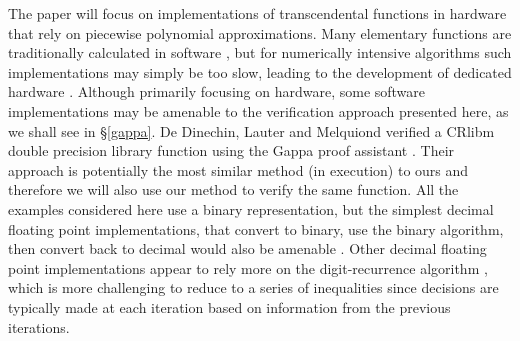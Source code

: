 \documentclass{fac}
\begin{document}
The paper will focus on implementations of transcendental functions in hardware that rely on piecewise polynomial approximations. Many elementary functions are traditionally calculated in software \cite{10.5555/1096483,gal1991accurate}, but for numerically intensive algorithms such implementations may simply be too slow, leading to the development of dedicated hardware \cite{tang1991table,strollo2011elementary,pineiro2004algorithm}. Although primarily focusing on hardware, some software implementations may be amenable to the verification approach presented here, as we shall see in \S\ref{gappa}. De Dinechin, Lauter and Melquiond verified a CRlibm double precision library function using the Gappa proof assistant \cite{daramy2009cr,5483294}. Their approach is potentially the most similar method (in execution) to ours and therefore we will also use our method to verify the same function. All the examples considered here use a binary representation, but the simplest decimal floating point implementations, that convert to binary, use the binary algorithm, then convert back to decimal would also be amenable \cite{5223332}. Other decimal floating point implementations appear to rely more on the digit-recurrence algorithm \cite{5223326,5710893}, which is more challenging to reduce to a series of inequalities since decisions are typically made at each iteration based on information from the previous iterations.

\end{document}
